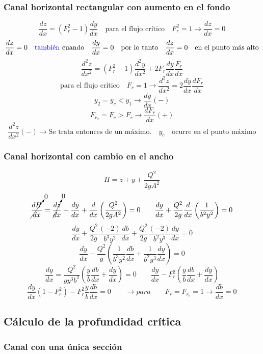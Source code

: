 \documentclass[11pt, oneside]{article}
\begin{document}
\subsubsection{Canal horizontal rectangular con aumento en el fondo}

$$\dfrac{dz}{dx}=(F^{2}_{r}-1)\dfrac{dy}{dx} \quad \text{para el flujo crítico} \quad F^{2}_{r}=1\rightarrow\dfrac{dz}{dx}=0$$
$$\dfrac{dz}{dx}=0 \quad \text{\textcolor{blue}{también} cuando} \quad\dfrac{dy}{dx}=0 \quad \text{por lo tanto} \quad \dfrac{dz}{dx}=0 \quad \text{en el punto más alto}$$
$$\dfrac{d^{2}z}{dx^{2}}=(F^{2}_{r}-1)\dfrac{d^{2}y}{dx^{2}}+2F_{r}\dfrac{dy}{dx}\dfrac{F_{r}}{dx}$$
$$\text{para el flujo crítico} \quad F_{r}=1\rightarrow\dfrac{d^{2}z}{dx^{2}}=2\dfrac{dy}{dx}\dfrac{dF_{r}}{dx}$$
$$y_{2}=y_{c}<y_{1}\rightarrow \dfrac{dy}{dx} (-)$$
$$F_{r_{2}}=F_{c}>F_{r}\rightarrow \dfrac{dF_{r}}{dx} (+)$$
$$\dfrac{d^{2}z}{dx^{2}}(-) \rightarrow \text{Se trata entonces de un máximo.} \quad y_c \quad\text{ocurre en el punto máximo} $$

\subsubsection{Canal horizontal con cambio en el ancho}
$$H=z+y+\dfrac{Q^{2}}{2gA^{2}}$$
$$\cancelto{0}{\dfrac{dH}{dx}}=\cancelto{0}{\dfrac{dz}{dx}}+\dfrac{dy}{dx}+\dfrac{d}{dx}\left(\dfrac{Q^{2}}{2gA^{2}}\right)=0 \qquad \dfrac{dy}{dx}+\dfrac{Q^{2}}{2g}\dfrac{d}{dx}\left(\dfrac{1}{b^{2}y^{2}}\right)=0$$
$$\dfrac{dy}{dx}+\dfrac{Q^{2}}{2g}\dfrac{(-2)}{b^{3}y^{2}}\dfrac{db}{dx}+\dfrac{Q^{2}}{2g}\dfrac{(-2)}{b^{2}y^{3}}\dfrac{dy}{dx}=0$$
$$\dfrac{dy}{dx}-\dfrac{Q^{2}}{y}\left(\dfrac{1}{b^{3}y^{2}}\dfrac{db}{dx}+\dfrac{1}{b^{2}y^{3}}\dfrac{dy}{dx}\right)=0$$
$$\dfrac{dy}{dx}=\dfrac{Q^{2}}{gy^{3}b^{2}}\left(\dfrac{y}{b}\dfrac{db}{dx}+\dfrac{dy}{dx}\right)=0 \qquad \dfrac{dy}{dx}-F^{2}_{r}\left(\dfrac{y}{b}\dfrac{db}{dx}+\dfrac{dy}{dx}\right)$$
$$\dfrac{dy}{dx}(1-F^{2}_{r})-F^{2}_{r}\dfrac{y}{b}\dfrac{db}{dx}=0 \qquad  \rightarrow para \qquad F_{r}=F_{r_{c}}=1\rightarrow\dfrac{db}{dx}=0$$

\subsection{Cálculo de la profundidad crítica}

\subsubsection{Canal con una única sección}
\end{document}
